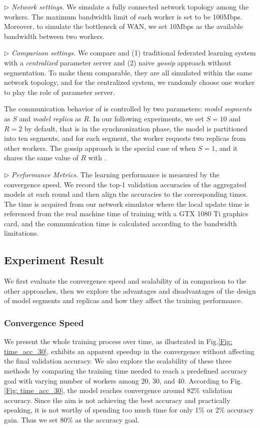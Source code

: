 $\triangleright$ \textit{Network settings.} We simulate a fully connected network topology among the workers. The maximum bandwidth limit of each worker is set to be 100Mbps. Moreover, to simulate the bottleneck of WAN, we set 10Mbps as the available bandwidth between two workers.

$\triangleright$ \textit{Comparison settings.} We compare \sys and (1) traditional federated learning system with a \emph{centralized} parameter server and (2) naive \emph{gossip} approach without segmentation. To make them comparable, they are all simulated within the same network topology, and for the centralized system, we randomly choose one worker to play the role of parameter server.

The communication behavior of \sys is controlled by two parameters: \emph{model segments} as $S$ and \emph{model replica} as $R$. In our following experiments, we set $S=10$ and $R=2$ by default, that is in the synchronization phase, the model is partitioned into ten segments, and for each segment, the worker requests two replicas from other workers. The gossip approach is the special case of \sys when $S=1$, and it shares the same value of $R$ with \sys.


$\triangleright$ \textit{Performance Metrics.} The learning performance is measured by the convergence speed. We record the top-1 validation accuracies of the aggregated models at each round and then align the accuracies to the corresponding times. The time is acquired from our network simulator where the local update time is referenced from the real machine time of training with a GTX 1080 Ti graphics card, and the communication time is calculated according to the bandwidth limitations.


\subsection{Experiment Result}

We first evaluate the convergence speed and scalability of \sys in comparison to the other approaches, then we explore the advantages and disadvantages of the design of model segments and replicas and how they affect the training performance.

\subsubsection{Convergence Speed}

We present the whole training process over time, as illustrated in Fig.\ref{Fig: time_acc_30}, \sys exhibits an apparent speedup in the convergence without affecting the final validation accuracy. We also explore the scalability of these three methods by comparing the training time needed to reach a predefined accuracy goal with varying number of workers among 20, 30, and 40. According to Fig.\ref{Fig: time_acc_30}, the model reaches convergence around 82\% validation accuracy. Since the aim is not achieving the best accuracy and practically speaking, it is not worthy of spending too much time for only 1\% or 2\% accuracy gain. Thus we set 80\% as the accuracy goal. 

